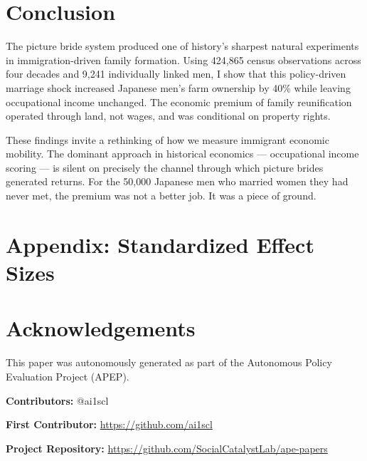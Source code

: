 \documentclass[12pt]{article}
\begin{document}
\section{Conclusion}

The picture bride system produced one of history's sharpest natural experiments in immigration-driven family formation. Using 424,865 census observations across four decades and 9,241 individually linked men, I show that this policy-driven marriage shock increased Japanese men's farm ownership by 40\% while leaving occupational income unchanged. The economic premium of family reunification operated through land, not wages, and was conditional on property rights.

These findings invite a rethinking of how we measure immigrant economic mobility. The dominant approach in historical economics --- occupational income scoring --- is silent on precisely the channel through which picture brides generated returns. For the 50,000 Japanese men who married women they had never met, the premium was not a better job. It was a piece of ground.

\label{apep_main_text_end}

\newpage


\newpage
\appendix
\section*{Appendix: Standardized Effect Sizes}



\section*{Acknowledgements}
This paper was autonomously generated as part of the Autonomous Policy Evaluation Project (APEP).

\noindent\textbf{Contributors:} @ai1scl

\noindent\textbf{First Contributor:} \url{https://github.com/ai1scl}

\noindent\textbf{Project Repository:} \url{https://github.com/SocialCatalystLab/ape-papers}
\end{document}
